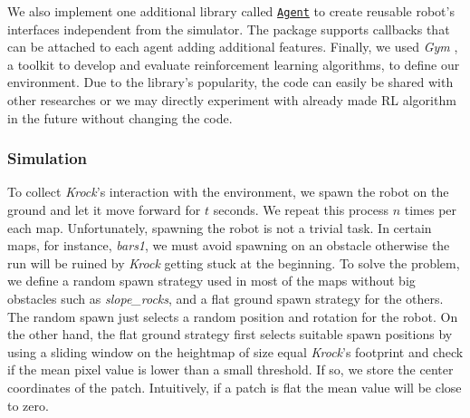 \documentclass[../document.tex]{subfiles}
\begin{document}
We also implement one additional library called \href{https://github.com/FrancescoSaverioZuppichini/Master-Thesis/tree/master/core/simulation/agent}{\texttt{Agent}} to create reusable robot's interfaces independent from the simulator. The package supports callbacks that can be attached to each agent adding additional features. Finally, we used \emph{Gym} \cite{gym}, a toolkit to develop and evaluate reinforcement learning algorithms, to define our environment. Due to the library's popularity,  the code can easily be shared with other researches or we may directly experiment with already made RL algorithm in the future without changing the code.

\subsubsection{Simulation}
To collect \emph{Krock}'s interaction with the environment, we spawn the robot on the ground and let it move forward for $t$ seconds. We repeat this process $n$ times per each map.
    Unfortunately, spawning the robot is not a trivial task. In certain maps, for instance, \emph{bars1}, we must avoid spawning on an obstacle otherwise the run will be ruined by \emph{Krock} getting stuck at the beginning. To solve the problem, we define a random spawn strategy used in most of the maps without big obstacles such as \emph{slope\_rocks}, and a flat ground spawn strategy for the others. The random spawn just selects a random position and rotation for the robot. On the other hand, the flat ground strategy first selects suitable spawn positions by using a sliding window on the heightmap of size equal \emph{Krock}'s footprint and check if the mean pixel value is lower than a small threshold. If so, we store the center coordinates of the patch. Intuitively, if a patch is flat the mean value will be close to zero.
    
\end{document}
